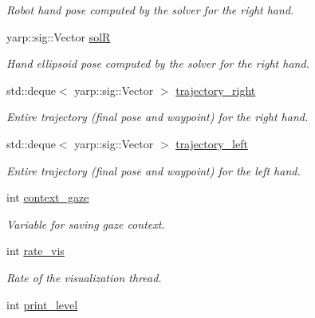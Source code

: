 \begin{DoxyCompactItemize}
\begin{DoxyCompactList}\small\item\em Robot hand pose computed by the solver for the right hand. \end{DoxyCompactList}\item 
yarp\+::sig\+::\+Vector \hyperlink{classGraspingModule_a1215352771f0e7f26e033ad95731a81e}{solR}\label{classGraspingModule_a1215352771f0e7f26e033ad95731a81e}

\begin{DoxyCompactList}\small\item\em Hand ellipsoid pose computed by the solver for the right hand. \end{DoxyCompactList}\item 
std\+::deque$<$ yarp\+::sig\+::\+Vector $>$ \hyperlink{classGraspingModule_ac7c1f1dc2e81ed15f87218feaa038988}{trajectory\+\_\+right}\label{classGraspingModule_ac7c1f1dc2e81ed15f87218feaa038988}

\begin{DoxyCompactList}\small\item\em Entire trajectory (final pose and waypoint) for the right hand. \end{DoxyCompactList}\item 
std\+::deque$<$ yarp\+::sig\+::\+Vector $>$ \hyperlink{classGraspingModule_afcfe41fdc6ce4446e89594a3d40d2a7d}{trajectory\+\_\+left}\label{classGraspingModule_afcfe41fdc6ce4446e89594a3d40d2a7d}

\begin{DoxyCompactList}\small\item\em Entire trajectory (final pose and waypoint) for the left hand. \end{DoxyCompactList}\item 
int \hyperlink{classGraspingModule_ab87532f4790da036cdf51654a649cece}{context\+\_\+gaze}\label{classGraspingModule_ab87532f4790da036cdf51654a649cece}

\begin{DoxyCompactList}\small\item\em Variable for saving gaze context. \end{DoxyCompactList}\item 
int \hyperlink{classGraspingModule_a26e3aee1196f9b3783426f5be6a387b5}{rate\+\_\+vis}\label{classGraspingModule_a26e3aee1196f9b3783426f5be6a387b5}

\begin{DoxyCompactList}\small\item\em Rate of the visualization thread. \end{DoxyCompactList}\item 
int \hyperlink{classGraspingModule_a244cb8f6f2b2294d2be164ee1518cc36}{print\+\_\+level}\label{classGraspingModule_a244cb8f6f2b2294d2be164ee1518cc36}


\end{DoxyCompactItemize}
